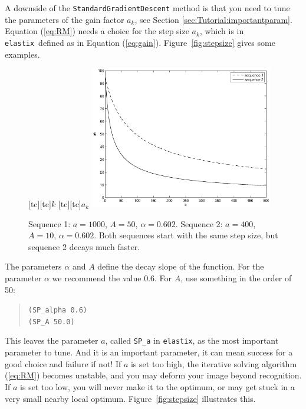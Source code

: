 \documentclass[]{report}
\newcommand{\elastix}{\texttt{elastix}}
\begin{document}
A downside of the \texttt{StandardGradientDescent} method is that
you need to tune the parameters of the gain factor $a_k$, see
Section \ref{sec:Tutorial:importantparam}. Equation (\ref{eq:RM})
needs a choice for the step size $a_k$, which is in \elastix\
defined as in Equation (\ref{eq:gain}). Figure~\ref{fig:stepsize}
gives some examples.

\begin{figure}[tb]
\centering {}[tc][tc]{$k$} [tc][tc]{$a_k$}
\includegraphics[width=8cm]{ak.eps}
\caption{Sequence 1: $a = 1000$, $A = 50$, $\alpha = 0.602$.
Sequence 2: $a = 400$, $A = 10$, $\alpha = 0.602$. Both sequences
start with the same step size, but sequence 2 decays much
faster.}\label{fig:ak}
\end{figure}
The parameters $\alpha$ and $A$ define the decay slope of the
function. For the parameter $\alpha$ we recommend the value 0.6.
For $A$, use something in the order of 50:
\begin{quote}
\texttt{(SP\_alpha 0.6)} \\
\texttt{(SP\_A 50.0)}
\end{quote}
This leaves the parameter $a$, called \texttt{SP\_a} in \elastix,
as the most important parameter to tune. And it is an important
parameter, it can mean success for a good choice and failure if
not! If $a$ is set too high, the iterative solving algorithm
(\ref{eq:RM}) becomes unstable, and you may deform your image
beyond recognition. If $a$ is set too low, you will never make it
to the optimum, or may get stuck in a very small nearby local
optimum. Figure~\ref{fig:stepsize} illustrates this.
\end{document}
